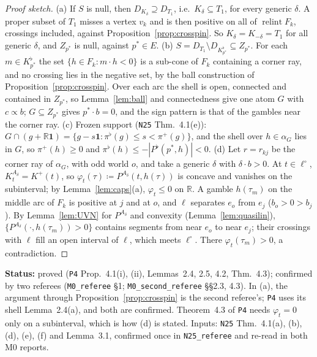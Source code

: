 \documentclass[11pt]{article}
\theoremstyle{definition}
\theoremstyle{remark}
\newcommand{\R}{\mathbb R}
\newcommand{\one}{\mathbf 1}
\newcommand{\relint}{\operatorname{relint}}
\newcommand{\src}[1]{\texttt{#1}}
\newcommand{\status}[1]{\par\smallskip\noindent\textbf{Status:} #1\par\smallskip}
\begin{document}
\begin{proof}[Proof sketch]
(a) If $S$ is null, then $D_{K_\delta}\supseteq D_{T_1}$, i.e.\ $K_\delta\subseteq T_1$, for every generic $\delta$. A proper subset of $T_1$ misses a vertex $v_k$ and is then positive on all of $\relint F_k$, crossings included, against Proposition~\ref{prop:crosspin}. So $K_\delta=K_{-\delta}=T_1$ for all generic $\delta$, and $Z_{p^*}$ is null, against $p^*\in E$. (b) $S=D_{T_1}\setminus D_{K^\flat_{p^*}}\subseteq Z_{p^*}$. For each $m\in K^\flat_{p^*}$ the set $\{h\in F_k:m\cdot h<0\}$ is a sub-cone of $F_k$ containing a corner ray, and no crossing lies in the negative set, by the ball construction of Proposition~\ref{prop:crosspin}. Over each arc the shell is open, connected and contained in $Z_{p^*}$, so Lemma~\ref{lem:ball} and connectedness give one atom $G$ with $c\propto b$; $G\subseteq Z_{p^*}$ gives $p^*\cdot b=0$, and the sign pattern is that of the gambles near the corner ray. (c) Frozen support (\src{N25} Thm.~4.1(e)): $G\cap(g+\R\one)=\{g-s\one:\pi^\flat(g)\le s<\pi^+(g)\}$, and the shell over $h\in\alpha_G$ lies in $G$, so $\pi^+(h)\ge0$ and $\pi^\flat(h)\le-|P^\flat(p^*,h)|<0$. (d) Let $r=r_{kj}$ be the corner ray of $\alpha_G$, with odd world $o$, and take a generic $\delta$ with $\delta\cdot b>0$. At $t\in\ell^\circ$, $K^{A_\delta}_t=K^+(t)$, so $\varphi_t(\tau)\coloneqq P^{A_\delta}(t,h(\tau))$ is concave and vanishes on the subinterval; by Lemma~\ref{lem:caps}(a), $\varphi_t\le0$ on $\R$. A gamble $h(\tau_m)$ on the middle arc of $F_k$ is positive at $j$ and at $o$, and $\ell$ separates $e_o$ from $e_j$ ($b_o>0>b_j$). By Lemma~\ref{lem:UVN} for $P^{A_\delta}$ and convexity (Lemma~\ref{lem:quasilin}), $\{P^{A_\delta}(\cdot,h(\tau_m))>0\}$ contains segments from near $e_o$ to near $e_j$; their crossings with $\ell$ fill an open interval of $\ell$, which meets $\ell^\circ$. There $\varphi_t(\tau_m)>0$, a contradiction.
\end{proof}
\status{proved (\src{P4} Prop.~4.1(i), (ii), Lemmas~2.4, 2.5, 4.2, Thm.~4.3); confirmed by two referees (\src{M0\_referee} \S1; \src{M0\_second\_referee} \S\S2.3, 4.3). In (a), the argument through Proposition~\ref{prop:crosspin} is the second referee's; \src{P4} uses its shell Lemma~2.4(a), and both are confirmed. Theorem~4.3 of \src{P4} needs $\varphi_t=0$ only on a subinterval, which is how (d) is stated. Inputs: \src{N25} Thm.~4.1(a), (b), (d), (e), (f) and Lemma~3.1, confirmed once in \src{N25\_referee} and re-read in both M0 reports.}
\end{document}
